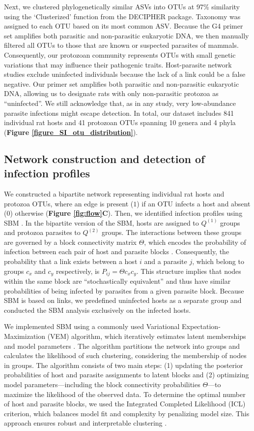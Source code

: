 \documentclass[oneside, a4paper, onecolumn, 11pt]{article}
\begin{document}
Next, we clustered phylogenetically similar ASVs into OTUs at 97\% similarity using the `Clusterized' function from the DECIPHER package. Taxonomy was assigned to each OTU based on its most common ASV. Because the G4 primer set amplifies both parasitic and non-parasitic eukaryotic DNA, we then manually filtered all OTUs to those that are known or suspected parasites of mammals. Consequently, our protozoan community represents OTUs with small genetic variations that may influence their pathogenic traits. Host-parasite network studies exclude uninfected individuals because the lack of a link could be a false negative. Our primer set amplifies both parasitic and non-parasitic eukaryotic DNA, allowing us to designate rats with only non-parasitic protozoa as ``uninfected''. We still acknowledge that, as in any study, very low-abundance parasite infections might escape detection. In total, our dataset includes 841 individual rat hosts and 41 protozoan OTUs spanning 10 genera and 4 phyla (\textbf{Figure \ref{figure_SI_otu_distribution}}). 

\subsection*{Network construction and detection of infection profiles}
We constructed a bipartite network representing individual rat hosts and protozoa OTUs, where an edge is present ($1$) if an OTU infects a host and absent ($0$) otherwise (\textbf{Figure \ref{fig:flow}C}). Then, we identified infection profiles using SBM \citep{Leger2016-ab}. In the bipartite version of the SBM, hosts are assigned to $Q^{(1)}$ groups and protozoa parasites to $Q^{(2)}$ groups. The interactions between these groups are governed by a block connectivity matrix $\Theta$, which encodes the probability of infection between each pair of host and parasite blocks \citep{Leger2016-ab}. Consequently, the probability that a link exists between a host $i$ and a parasite $j$, which belong to groups $c_x$ and $c_y$ respectively, is $P_{ij} = \Theta{c_x c_y}$. This structure implies that nodes within the same block are ``stochastically equivalent'' and thus have similar probabilities of being infected by parasites from a given parasite block. Because SBM is based on links, we predefined uninfected hosts as a separate group and conducted the SBM analysis exclusively on the infected hosts.

We implemented SBM using a commonly used Variational Expectation-Maximization (VEM) algorithm, which iteratively estimates latent memberships and model parameters \citep{Leger2016-ab}. The algorithm partitions the network into groups and calculates the likelihood of such clustering, considering the membership of nodes in groups. The algorithm consists of two main steps: (1) updating the posterior probabilities of host and parasite assignments to latent blocks and (2) optimizing model parameters—including the block connectivity probabilities $\Theta$—to maximize the likelihood of the observed data. To determine the optimal number of host and parasite blocks, we used the Integrated Completed Likelihood (ICL) criterion, which balances model fit and complexity by penalizing model size. This approach ensures robust and interpretable clustering \citep{Leger2016-ab}.
\end{document}
